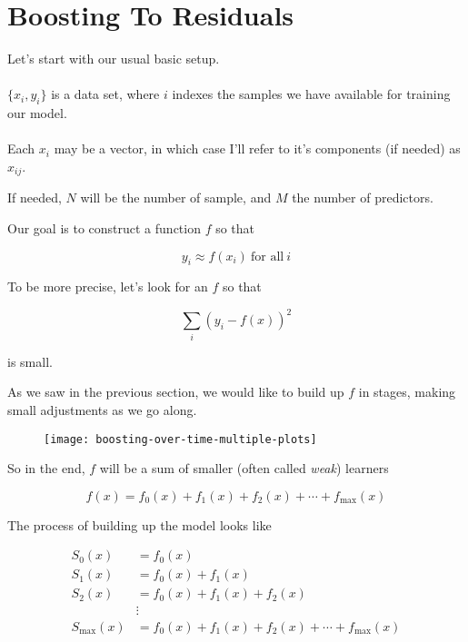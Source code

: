 \section{Boosting To Residuals}

\begin{frame}
Let's start with our usual basic setup.\\~\\

$\{ x_i, y_i \}$ is a data set, where $i$ indexes the samples we have available for training our model.\\~\\

Each $x_i$ may be a vector, in which case I'll refer to it's components (if needed) as $x_{ij}$.

If needed, $N$ will be the number of sample, and $M$ the number of predictors.
\end{frame}
%

\begin{frame}
Our goal is to construct a function $f$ so that

$$ y_i \approx f(x_i) \ \text{for all} \ i $$

\end{frame}
%

\begin{frame}
To be more precise, let's look for an $f$ so that 

$$ \sum_i \left( y_i - f(x) \right)^2 $$

is small.
\end{frame}
%

\begin{frame}
As we saw in the previous section, we would like to build up $f$ in stages, making small adjustments as we go along.

  \begin{figure}
    \texttt{[image: boosting-over-time-multiple-plots]}
  \end{figure}
  
\end{frame}
%

\begin{frame}
So in the end, $f$ will be a sum of smaller (often called \textit{weak}) learners

$$ f(x) = f_0(x) + f_1(x) + f_2(x) + \cdots + f_{\text{max}}(x) $$

The process of building up the model looks like

\begin{align*}
    S_0(x) &= f_0(x) \\
    S_1(x) &= f_0(x) + f_1(x) \\
    S_2(x) &= f_0(x) + f_1(x) + f_2(x) \\
    &\vdots \\
    S_{\text{max}}(x) &= f_0(x) + f_1(x) + f_2(x) + \cdots + f_{\text{max}}(x) \\
\end{align*}
\end{frame} 
%

